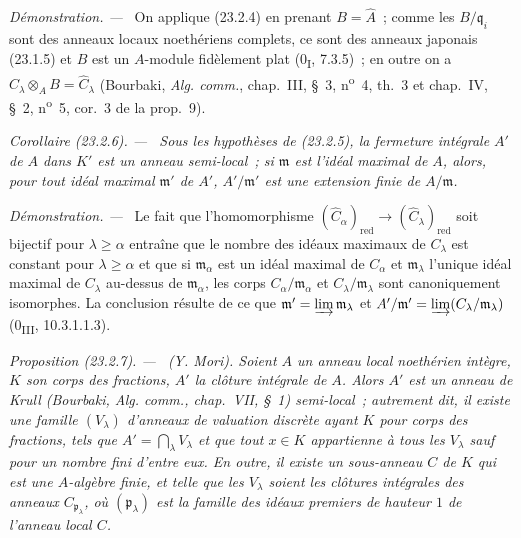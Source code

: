 \documentclass[10pt,oneside]{book}
\makeatletter
\newcommand{\setmanualcurrentlabel}[1]{\def\@currentlabel{#1}}
\newcommand{\oldpage}[2][]{%
  \setcounter{footnote}{0}%
  \marginpar{\scriptsize\textbf{#1}~|~#2}\ignorespaces}
\newenvironment{proposition}[1][]{%
  \setmanualcurrentlabel{#1}\par\medskip\noindent\itshape Proposition (#1). ---\ }{\par}
\newenvironment{corollary}[1][]{%
  \setmanualcurrentlabel{#1}\par\medskip\noindent\itshape Corollaire (#1). ---\ }{\par}
\newenvironment{proof}{%
  \par\medskip\noindent\textit{Démonstration. ---\ }}{\par}
\makeatother
\begin{document}
\oldpage[0\textsubscript{IV-1}]{219}

\begin{proof}
On applique (23.2.4) en prenant $B=\widehat A$~; comme les
$B/\mathfrak q_i$ sont des anneaux locaux noethériens complets, ce sont des
anneaux japonais (23.1.5) et $B$ est un $A$-module fidèlement plat
(0\textsubscript{I}, 7.3.5)~; en outre on a
$C_\lambda\otimes_AB=\widehat C_\lambda$ (Bourbaki, \emph{Alg. comm.},
chap.~III, §~3, n\textsuperscript{o}~4, th.~3 et chap.~IV, §~2,
n\textsuperscript{o}~5, cor.~3 de la prop.~9).
\end{proof}

\begin{corollary}[23.2.6]
\label{0.23.2.6-fr}
Sous les hypothèses de (23.2.5), la fermeture intégrale $A'$ de $A$ dans
$K'$ est un anneau semi-local~; si $\mathfrak m$ est l'idéal maximal de $A$,
alors, pour tout idéal maximal $\mathfrak m'$ de $A'$,
$A'/\mathfrak m'$ est une extension finie de $A/\mathfrak m$.
\end{corollary}

\begin{proof}
Le fait que l'homomorphisme
$(\widehat C_\alpha)_{\mathrm{red}}\to
(\widehat C_\lambda)_{\mathrm{red}}$ soit bijectif pour
$\lambda\geqslant\alpha$ entraîne que le nombre des idéaux maximaux de
$C_\lambda$ est constant pour $\lambda\geqslant\alpha$ et que si
$\mathfrak m_\alpha$ est un idéal maximal de $C_\alpha$ et
$\mathfrak m_\lambda$ l'unique idéal maximal de $C_\lambda$ au-dessus de
$\mathfrak m_\alpha$, les corps $C_\alpha/\mathfrak m_\alpha$ et
$C_\lambda/\mathfrak m_\lambda$ sont canoniquement isomorphes. La conclusion
résulte de ce que $\mathfrak m'=\varinjlim\mathfrak m_\lambda$ et
$A'/\mathfrak m'=\varinjlim(C_\lambda/\mathfrak m_\lambda)$
(0\textsubscript{III}, 10.3.1.1.3).
\end{proof}

\begin{proposition}[23.2.7]
\label{0.23.2.7-fr}
\textnormal{(Y. Mori).} Soient $A$ un anneau local noethérien intègre, $K$ son
corps des fractions, $A'$ la clôture intégrale de $A$. Alors $A'$ est un
anneau de Krull (Bourbaki, \emph{Alg. comm.}, chap.~VII, §~1) semi-local~;
autrement dit, il existe une famille $(V_\lambda)$ d'anneaux de valuation
discrète ayant $K$ pour corps des fractions, tels que
$A'=\bigcap_\lambda V_\lambda$ et que tout $x\in K$ appartienne à tous les
$V_\lambda$ sauf pour un nombre fini d'entre eux. En outre, il existe un
sous-anneau $C$ de $K$ qui est une $A$-algèbre finie, et telle que les
$V_\lambda$ soient les clôtures intégrales des anneaux
$C_{\mathfrak p_\lambda}$, où $(\mathfrak p_\lambda)$ est la famille des
idéaux premiers de hauteur $1$ de l'anneau local $C$.
\end{proposition}
\end{document}
